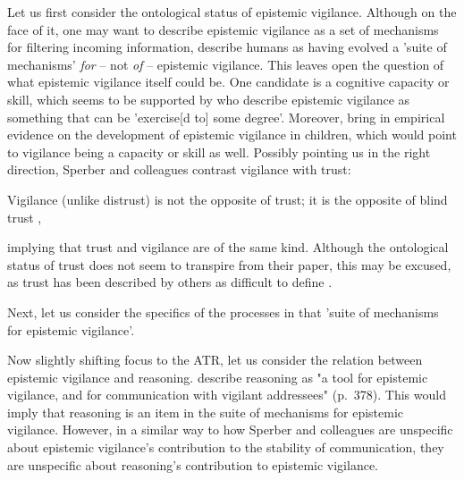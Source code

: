 Let us first consider the ontological status of epistemic vigilance. Although on the face of it, one may want to describe epistemic vigilance as a set of mechanisms for filtering incoming information, \citet{Sperber10} describe humans as having evolved a 'suite of mechanisms' \emph{for} -- not \emph{of} -- epistemic vigilance. This leaves open the question of what epistemic vigilance itself could be. One candidate is a cognitive capacity or skill, which seems to be supported by \citet[p.~60]{MS11} who describe epistemic vigilance as something that can be 'exercise[d to] some degree'. Moreover, \citet[\S 5]{Sperber10} bring in empirical evidence on the development of epistemic vigilance in children, which would point to vigilance being a capacity or skill as well.
Possibly pointing us in the right direction, Sperber and colleagues contrast vigilance with trust:
\begin{quoting}
    Vigilance (unlike distrust) is not the opposite of trust; it is the opposite
of blind trust
    \hfill \citep[p.~363]{Sperber10},
\end{quoting}
 implying that trust and vigilance are of the same kind. Although the ontological status of trust does not seem to transpire from their \citeyear{Sperber10} paper, this may be excused, as trust has been described by others as difficult to define \citep{Simpson12,McKnight00}.

Next, let us consider the specifics of the processes in that 'suite of mechanisms for epistemic vigilance'.

Now slightly shifting focus to the ATR, let us consider the relation between epistemic vigilance and reasoning. \citet{Sperber10} describe reasoning as "a tool for epistemic vigilance, and for communication with vigilant addressees" (p.~378). This would imply that reasoning is an item in the suite of mechanisms for epistemic vigilance. However, in a similar way to how Sperber and colleagues are unspecific about epistemic vigilance's contribution to the stability of communication, they are unspecific about reasoning's contribution to epistemic vigilance.

